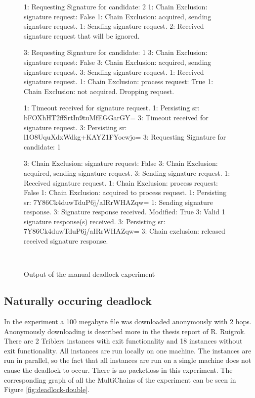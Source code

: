 \begin{figure}
\begin{FVerbatim}[fontsize=\small]
1: Requesting Signature for candidate: 2
1: Chain Exclusion: signature request: False
1: Chain Exclusion: acquired, sending signature request.
1: Sending signature request.
2: Received signature request that will be ignored.

3: Requesting Signature for candidate: 1
3: Chain Exclusion: signature request: False
3: Chain Exclusion: acquired, sending signature request.
3: Sending signature request.
1: Received signature request.
1: Chain Exclusion: process request: True
1: Chain Exclusion: not acquired. Dropping request.

1: Timeout received for signature request.
1: Persisting sr: bFOXhHT2ffSrtIn9tuMfEGGarGY=
3: Timeout received for signature request.
3: Persisting sr: l1O8UquXdxWdkg+KAYZ1FYocwjo=
3: Requesting Signature for candidate: 1

3: Chain Exclusion: signature request: False
3: Chain Exclusion: acquired, sending signature request.
3: Sending signature request.
1: Received signature request.
1: Chain Exclusion: process request: False
1: Chain Exclusion: acquired to process request.
1: Persisting sr: 7Y86Ck4duwTduP6j/aIRrWHAZqw=
1: Sending signature response.
3: Signature response received. Modified: True
3: Valid 1 signature response(s) received.
3: Persisting sr: 7Y86Ck4duwTduP6j/aIRrWHAZqw=
3: Chain exclusion: released received signature response.
\end{FVerbatim}
    \caption{Output of the manual deadlock experiment}~\label{fig:manual-deadlock-experiment}
\end{figure}

\subsection{Naturally occuring deadlock}
In the experiment a 100 megabyte file was downloaded anonymously with 2 hops.
Anonymously downloading is described more in the thesis report of R. Ruigrok\cite{ruigrok-anonymous}.
There are 2 Triblers instances with exit functionality and 18 instances without exit functionality.
All instances are run locally on one machine.
The instances are run in parallel,
so the fact that all instances are run on a single machine does not cause the deadlock to occur.
There is no packetloss in this experiment.
The corresponding graph of all the MultiChains of the experiment can be seen in Figure \ref{fig:deadlock-double}.

